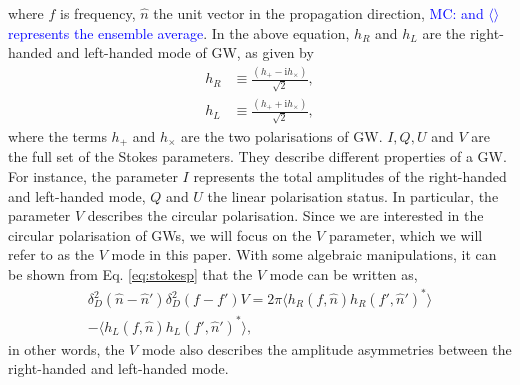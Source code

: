\documentclass[aps,twocolumn,showpacs,groupedaddress, nofootinbib]{revtex4}  %
\newcommand{\MC}[1]{\textcolor{blue}{MC: #1}}
\begin{document}
where $f$ is frequency, $\hat{n}$ the unit vector in the propagation direction, \MC{and $\langle \rangle$ represents the ensemble average}.
In the above equation, $h_R$ and $h_L$ are  the right-handed and left-handed mode of \ac{GW}, as given by
\begin{align}\label{eq:rhlh}
 h_R &\equiv \frac{(h_{+} - \text{i}h_{\times})}{\sqrt{2}},\nonumber \\
 h_L &\equiv \frac{(h_{+} + \text{i}h_{\times})}{\sqrt{2}},
\end{align}
where the terms $h_{+}$ and $h_{\times}$ are the two polarisations of \ac{GW}.
$I, Q, U$ and $V$ are the full set of the Stokes parameters.
They describe different properties of a \ac{GW}. 
For instance, the parameter $I$ represents the total amplitudes of the right-handed and left-handed mode,
$Q$ and $U$ the linear polarisation status. 
In particular, the parameter $V$  describes the circular polarisation.
Since we are interested in the circular polarisation of \acp{GW}, 
we will focus on the $V$ parameter, which we will refer to as the $V$ mode in this paper.
With some algebraic manipulations, it can be shown from Eq. \ref{eq:stokesp} that the $V$ mode can be written as,
\begin{align}\label{eq:stokesV}
 \delta_{D}^2(\hat{n} - \hat{n}')\delta_{D}^2(f - f')V = 2\pi \langle h_R(f, \hat{n}) h_R(f', \hat{n}')^{*}\rangle  \nonumber \\
 -  \langle h_L(f, \hat{n}) h_L(f', \hat{n}')^{*}\rangle,
\end{align}
in other words, the $V$ mode also describes the amplitude asymmetries between the right-handed and left-handed mode.
\end{document}
